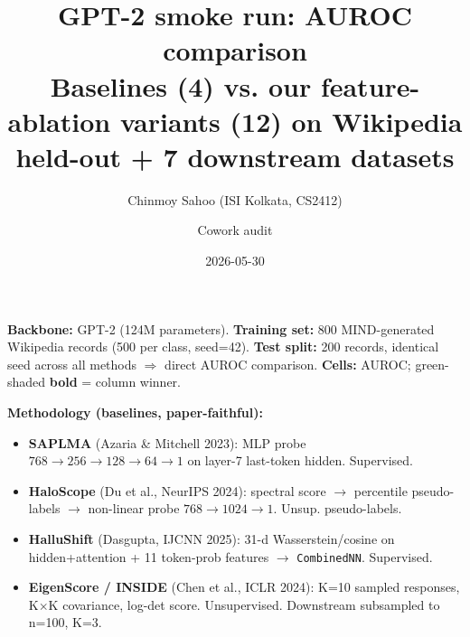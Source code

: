 \documentclass[10pt]{article}
\title{GPT-2 smoke run: AUROC comparison\\
\large Baselines (4) vs. our feature-ablation variants (12) on Wikipedia held-out + 7 downstream datasets}
\author{Chinmoy Sahoo (ISI Kolkata, CS2412) \and Cowork audit}
\date{2026-05-30}
\begin{document}
\maketitle

\noindent\textbf{Backbone:} GPT-2 (124M parameters). \textbf{Training set:} 800 MIND-generated Wikipedia records (500 per class, seed=42). \textbf{Test split:} 200 records, identical seed across all methods $\Rightarrow$ direct AUROC comparison. \textbf{Cells:} AUROC; green-shaded \textbf{bold} = column winner.

\vspace{0.3cm}

\noindent\textbf{Methodology (baselines, paper-faithful):}
\begin{itemize}\setlength\itemsep{-2pt}
  \item \textbf{SAPLMA} (Azaria \& Mitchell 2023): MLP probe $768{\to}256{\to}128{\to}64{\to}1$ on layer-7 last-token hidden. Supervised.
  \item \textbf{HaloScope} (Du et al., NeurIPS 2024): spectral score $\to$ percentile pseudo-labels $\to$ non-linear probe $768{\to}1024{\to}1$. Unsup. pseudo-labels.
  \item \textbf{HalluShift} (Dasgupta, IJCNN 2025): 31-d Wasserstein/cosine on hidden+attention + 11 token-prob features $\to$ \texttt{CombinedNN}. Supervised.
  \item \textbf{EigenScore / INSIDE} (Chen et al., ICLR 2024): K=10 sampled responses, K$\times$K covariance, log-det score. Unsupervised. Downstream subsampled to n=100, K=3.
\end{itemize}

\vspace{0.2cm}
\end{document}
